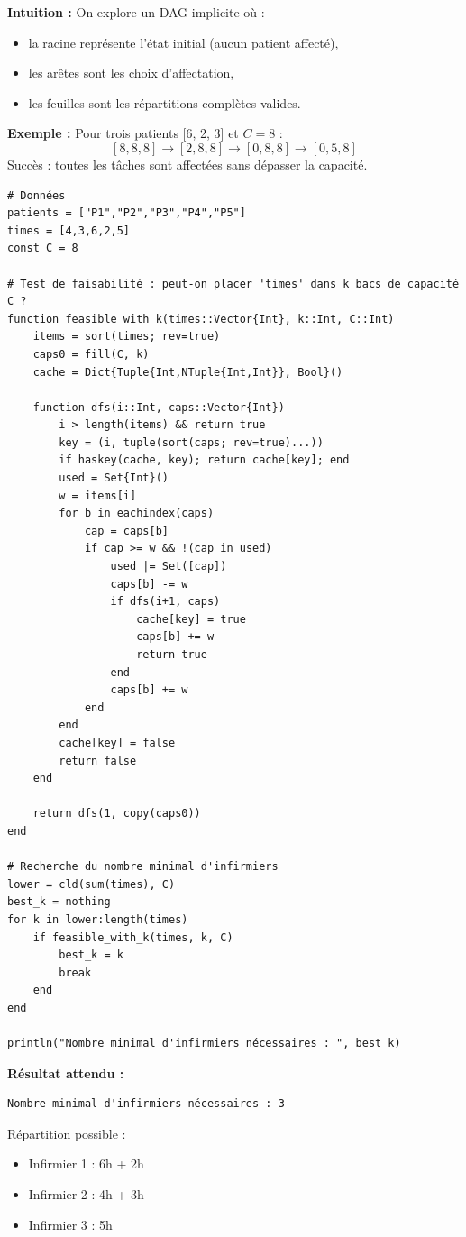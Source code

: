 \textbf{Intuition :}  
On explore un DAG implicite où :
\begin{itemize}
    \item la racine représente l’état initial (aucun patient affecté),
    \item les arêtes sont les choix d’affectation,
    \item les feuilles sont les répartitions complètes valides.
\end{itemize}

\textbf{Exemple :}  
Pour trois patients [6, 2, 3] et $C=8$ :
\[
[8,8,8] \rightarrow [2,8,8] \rightarrow [0,8,8] \rightarrow [0,5,8]
\]
Succès : toutes les tâches sont affectées sans dépasser la capacité. \\


\begin{lstlisting}
# Données
patients = ["P1","P2","P3","P4","P5"]
times = [4,3,6,2,5]
const C = 8

# Test de faisabilité : peut-on placer 'times' dans k bacs de capacité C ?
function feasible_with_k(times::Vector{Int}, k::Int, C::Int)
    items = sort(times; rev=true)
    caps0 = fill(C, k)
    cache = Dict{Tuple{Int,NTuple{Int,Int}}, Bool}()

    function dfs(i::Int, caps::Vector{Int})
        i > length(items) && return true
        key = (i, tuple(sort(caps; rev=true)...))
        if haskey(cache, key); return cache[key]; end
        used = Set{Int}()
        w = items[i]
        for b in eachindex(caps)
            cap = caps[b]
            if cap >= w && !(cap in used)
                used |= Set([cap])
                caps[b] -= w
                if dfs(i+1, caps)
                    cache[key] = true
                    caps[b] += w
                    return true
                end
                caps[b] += w
            end
        end
        cache[key] = false
        return false
    end

    return dfs(1, copy(caps0))
end

# Recherche du nombre minimal d'infirmiers
lower = cld(sum(times), C)
best_k = nothing
for k in lower:length(times)
    if feasible_with_k(times, k, C)
        best_k = k
        break
    end
end

println("Nombre minimal d'infirmiers nécessaires : ", best_k)
\end{lstlisting}

\textbf{Résultat attendu :}
\begin{lstlisting}
Nombre minimal d'infirmiers nécessaires : 3
\end{lstlisting}

Répartition possible :
\begin{itemize}
    \item Infirmier 1 : 6h + 2h
    \item Infirmier 2 : 4h + 3h
    \item Infirmier 3 : 5h
\end{itemize}

